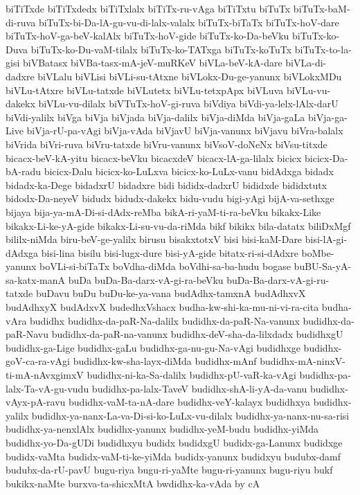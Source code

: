 {biTiTxde
biTiTxdedx
biTiTxlalx
biTiTx-ru-vAga
biTiTxtu
biTuTx
biTuTx-baM-di-ruva
biTuTx-bi-Da-lA-gu-vu-di-lalx-valalx
biTuTx-biTaTx
biTuTx-hoV-dare
biTuTx-hoV-ga-beV-kalAlx
biTuTx-hoV-gide
biTuTx-ko-Da-beVku
biTuTx-ko-Duva
biTuTx-ko-Du-vaM-tilalx
biTuTx-ko-TATxga
biTuTx-koTuTx
biTuTx-to-la-gisi
biVBatasx
biVBa-tasx-mA-jeV-muRKeV
biVLa-beV-kA-dare
biVLa-di-dadxre
biVLalu
biVLisi
biVLi-su-tAtxne
biVLokx-Du-ge-yanunx
biVLokxMDu
biVLu-tAtxre
biVLu-tatxde
biVLutetx
biVLu-tetxpApx
biVLuva
biVLu-vu-dakekx
biVLu-vu-dilalx
biVTuTx-hoV-gi-ruva
biVdiya
biVdi-ya-lelx-lAlx-darU
biVdi-yalilx
biVga
biVja
biVjada
biVja-dalilx
biVja-diMda
biVja-gaLa
biVja-ga-Live
biVja-rU-pa-vAgi
biVja-vAda
biVjavU
biVja-vanunx
biVjavu
biVra-balalx
biVrida
biVri-ruva
biVru-tatxde
biVru-vanunx
biVsoV-doNeNx
biVsu-titxde
bicacx-beV-kA-yitu
bicacx-beVku
bicacxdeV
bicacx-lA-ga-lilalx
bicicx
bicicx-Da-bA-radu
bicicx-Dalu
bicicx-ko-LuLxva
bicicx-ko-LuLx-vanu
bidAdxga
bidadx
bidadx-ka-Dege
bidadxrU
bidadxre
bidi
bididx-dadxrU
bididxde
bididxtutx
bidodx-Da-neyeV
bidudx
bidudx-dakekx
bidu-vudu
bigi-yAgi
bijA-va-sethxge
bijaya
bija-ya-mA-Di-si-dAdx-reMba
bikA-ri-yaM-ti-ra-beVku
bikakx-Like
bikakx-Li-ke-yA-gide
bikakx-Li-su-vu-da-riMda
bikf
bikikx
bila-datatx
biliDxMgf
bililx-niMda
biru-beV-ge-yalilx
birusu
bisakxtotxV
bisi
bisi-kaM-Dare
bisi-lA-gi-dAdxga
bisi-lina
bisilu
bisi-lugx-dure
bisi-yA-gide
bitatx-ri-si-dAdxre
boMbe-yanunx
boVLi-si-biTaTx
boVdha-diMda
boVdhi-sa-ba-hudu
bogase
buBU-Sa-yA-sa-katx-manA
buDa
buDa-Ba-darx-vA-gi-ra-beVku
buDa-Ba-darx-vA-gi-ru-tatxde
buDavu
buDu
buDu-ke-ya-vana
budAdhx-tamxnA
budAdhxvX
budAdhxyX
budAdxvX
budedhxVshacx
budha-kw-shi-ka-mu-ni-vi-ra-cita
budha-vAra
budidhx
budidhx-da-paR-Na-dalilx
budidhx-da-paR-Na-vanunx
budidhx-da-paR-Navu
budidhx-da-paR-na-vanunx
budidhx-deV-sha-da-lilxdadx
budidhxgU
budidhx-ga-Lige
budidhx-gaLu
budidhx-ga-nu-gu-Na-vAgi
budidhxge
budidhx-goV-ca-ra-vAgi
budidhx-kw-sha-layx-diMda
budidhx-mAnf
budidhx-mA-ninxV-ti-mA-nAvxgimxV
budidhx-ni-ka-Sa-dalilx
budidhx-pU-vaR-ka-vAgi
budidhx-pa-lalx-Ta-vA-gu-vudu
budidhx-pa-lalx-TaveV
budidhx-shA-li-yA-da-vanu
budidhx-vAyx-pA-ravu
budidhx-vaM-ta-nA-dare
budidhx-veY-kalayx
budidhxya
budidhx-yalilx
budidhx-ya-nanx-La-va-Di-si-ko-LuLx-vu-dilalx
budidhx-ya-nanx-nu-sa-risi
budidhx-ya-nenxlAlx
budidhx-yanunx
budidhx-yeM-budu
budidhx-yiMda
budidhx-yo-Da-gUDi
budidhxyu
budidx
budidxgU
budidx-ga-Lanunx
budidxge
budidx-vaMta
budidx-vaM-ti-ke-yiMda
budidx-yanunx
budidxyu
budubx-damf
budubx-da-rU-pavU
bugu-riya
bugu-ri-yaMte
bugu-ri-yanunx
bugu-riyu
bukf
bukikx-naMte
burxva-ta-shicxMtA
bwdidhx-ka-vAda
by
cA
}
